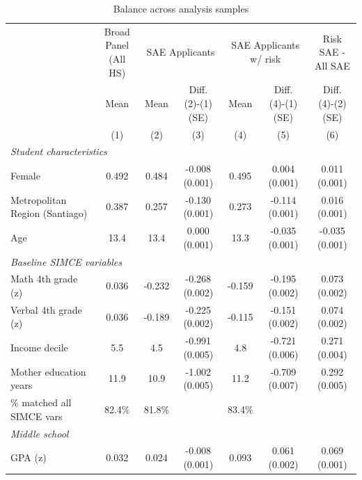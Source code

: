 \begin{table}[H]
\centering
\caption{Balance across analysis samples}
\label{tab:balance_samples}
\scriptsize
\setlength{\tabcolsep}{2pt}
\begin{tabular}{@{}lcccccc@{}}
\toprule
 & \shortstack{Broad Panel\\(All HS)} & \multicolumn{2}{c}{SAE Applicants} & \multicolumn{2}{c}{SAE Applicants w/ risk} & \shortstack{Risk SAE -\\All SAE} \\
\cmidrule(lr){3-4} \cmidrule(lr){5-6}
 & Mean & Mean & \shortstack{Diff.\\(2)-(1)\\(SE)} & Mean & \shortstack{Diff.\\(4)-(1)\\(SE)} & \shortstack{Diff.\\(4)-(2)\\(SE)} \\
 & (1) & (2) & (3) & (4) & (5) & (6) \\
\midrule
\multicolumn{7}{l}{\textit{Student characteristics}} \\[2pt]
Female & 0.492 & 0.484 & -0.008 (0.001) & 0.495 & 0.004 (0.001) & 0.011 (0.001) \\
Metropolitan Region (Santiago) & 0.387 & 0.257 & -0.130 (0.001) & 0.273 & -0.114 (0.001) & 0.016 (0.001) \\
Age & 13.4 & 13.4 & 0.000 (0.001) & 13.3 & -0.035 (0.001) & -0.035 (0.001) \\
\midrule
\multicolumn{7}{l}{\textit{Baseline SIMCE variables}} \\[2pt]
Math 4th grade (z) & 0.036 & -0.232 & -0.268 (0.002) & -0.159 & -0.195 (0.002) & 0.073 (0.002) \\
Verbal 4th grade (z) & 0.036 & -0.189 & -0.225 (0.002) & -0.115 & -0.151 (0.002) & 0.074 (0.002) \\
Income decile & 5.5 & 4.5 & -0.991 (0.005) & 4.8 & -0.721 (0.006) & 0.271 (0.004) \\
Mother education years & 11.9 & 10.9 & -1.002 (0.005) & 11.2 & -0.709 (0.007) & 0.292 (0.005) \\
\quad\footnotesize{\% matched all SIMCE vars} & \footnotesize{82.4\%} & \footnotesize{81.8\%} &  & \footnotesize{83.4\%} &  &  \\
\midrule
\multicolumn{7}{l}{\textit{Middle school}} \\[2pt]
GPA (z) & 0.032 & 0.024 & -0.008 (0.001) & 0.093 & 0.061 (0.002) & 0.069 (0.001) \\

\end{tabular}
\end{table}
